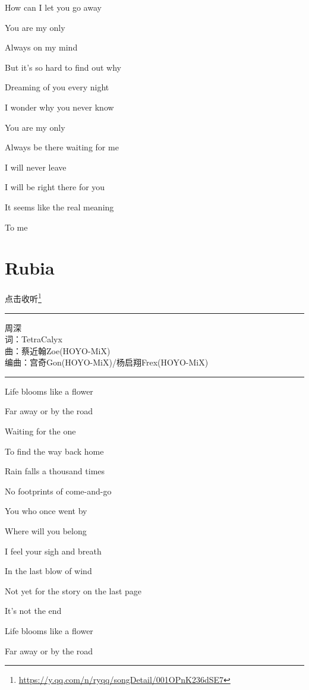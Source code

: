 \documentclass[]{ctexbook}
\renewcommand{\href}[2]{#2\footnote{\url{#1}}}
\begin{document}
How can I let you go away

You are my only

Always on my mind

But it's so hard to find out why

Dreaming of you every night

I wonder why you never know

You are my only

Always be there waiting for me

I will never leave

I will be right there for you

It seems like the real meaning

To me

\section*{Rubia}\label{rubia}


\href{https://y.qq.com/n/ryqq/songDetail/001OPnK236dSE7}{点击收听}

\begin{center}\rule{0.5\linewidth}{0.5pt}\end{center}

周深\\
词：TetraCalyx\\
曲：蔡近翰Zoe(HOYO-MiX)\\
编曲：宫奇Gon(HOYO-MiX)/杨启翔Frex(HOYO-MiX)

\begin{center}\rule{0.5\linewidth}{0.5pt}\end{center}

Life blooms like a flower

Far away or by the road

Waiting for the one

To find the way back home

Rain falls a thousand times

No footprints of come-and-go

You who once went by

Where will you belong

I feel your sigh and breath

In the last blow of wind

Not yet for the story on the last page

It's not the end

Life blooms like a flower

Far away or by the road
\end{document}
